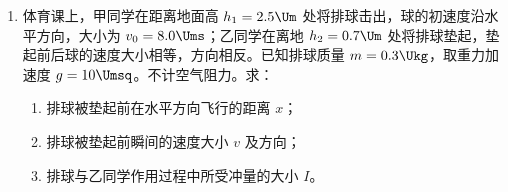 \documentclass[\gkver]{gaokaozhenti}
\begin{document}
\begin{enumerate}
{（2）做出图像如图所示


（3）根据 $v = gt$，可知

$g = \frac{v}{t}$

根据 $v-t$ 图像可知其斜率为重力加速度，则有

$g = \frac{2.7 - 0.35}{0.24}\Umsq = 9.79\Umsq$

（4）需要测量的物理量：水滴下落的高度 $h$ 和下落的时间 $t$。

测量 $h$ 的方法：用刻度尺测量水龙头出水口到地面的高度，多次测量取平均值；

测量 $t$ 的方法：调节水龙头阀门，使一滴水开始下落的同时，恰好听到前一滴水落地时发出的清脆声音。用手机测量 $n$ 滴水下落的总时间 $t_{n}$，则 $t = \frac{t_{n}}{n}$
}

\item
体育课上，甲同学在距离地面高 $h_{1} = 2.5\Um$ 处将排球击出，球的初速度沿水平方向，大小为 $v_{0} = 8.0\Ums$；乙同学在离地 $h_{2} = 0.7\Um$ 处将排球垫起，垫起前后球的速度大小相等，方向相反。已知排球质量 $m = 0.3\Ukg$，取重力加速度 $g = 10\Umsq$。不计空气阻力。求：
\begin{enumerate}
	\item
	排球被垫起前在水平方向飞行的距离 $x$；
	\item
	排球被垫起前瞬间的速度大小 $v$ 及方向；
	\item
	排球与乙同学作用过程中所受冲量的大小 $I$。
\end{enumerate}


\end{enumerate}
\end{document}
